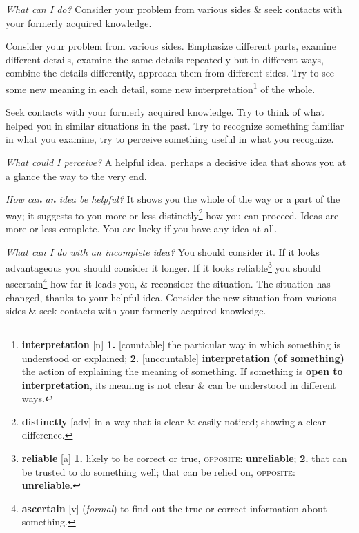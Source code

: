 \documentclass[oneside]{book}
\numberwithin{equation}{section}
\begin{document}
\textit{What can I do?} Consider your problem from various sides \& seek contacts with your formerly acquired knowledge.

Consider your problem from various sides. Emphasize different parts, examine different details, examine the same details repeatedly but in different ways, combine the details differently, approach them from different sides. Try to see some new meaning in each detail, some new interpretation\footnote{\textbf{interpretation} [n] \textbf{1.} [countable] the particular way in which something is understood or explained; \textbf{2.} [uncountable] \textbf{interpretation (of something)} the action of explaining the meaning of something. If something is \textbf{open to interpretation}, its meaning is not clear \& can be understood in different ways.} of the whole.

Seek contacts with your formerly acquired knowledge. Try to think of what helped you in similar situations in the past. Try to recognize something familiar in what you examine, try to perceive something useful in what you recognize.

\textit{What could I perceive?} A helpful idea, perhaps a decisive idea that shows you at a glance the way to the very end.

\textit{How can an idea be helpful?} It shows you the whole of the way or a part of the way; it suggests to you more or less distinctly\footnote{\textbf{distinctly} [adv] in a way that is clear \& easily noticed; showing a clear difference.} how you can proceed. Ideas are more or less complete. You are lucky if you have any idea at all.

\textit{What can I do with an incomplete idea?} You should consider it. If it looks advantageous you should consider it longer. If it looks reliable\footnote{\textbf{reliable} [a] \textbf{1.} likely to be correct or true, \textsc{opposite}: \textbf{unreliable}; \textbf{2.} that can be trusted to do something well; that can be relied on, \textsc{opposite}: \textbf{unreliable}.} you should ascertain\footnote{\textbf{ascertain} [v] (\textit{formal}) to find out the true or correct information about something.} how far it leads you, \& reconsider the situation. The situation has changed, thanks to your helpful idea. Consider the new situation from various sides \& seek contacts with your formerly acquired knowledge.
\end{document}
